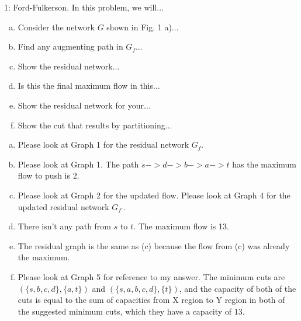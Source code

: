 \begin{problem}{1: Ford-Fulkerson.} In this problem, we will... 
\begin{enumerate}[(a)]
    \item Consider the network $G$ shown in Fig. 1 a)...
    \item Find any augmenting path in $G_f$...
    \item Show the residual network...
    \item Is this the final maximum flow in this...
    \item Show the residual network for your...
    \item Show the cut that results by partitioning...
\end{enumerate}
\end{problem}
\begin{sol}
\begin{enumerate}[(a)]
    \item Please look at Graph 1 for the residual network $G_f$.
    \item Please look at Graph 1. The path $s->d->b->a->t$ has the maximum flow to push is 2.
    \item Please look at Graph 2 for the updated flow. Please look at Graph 4 for the updated residual network $G_{f'}$.
    \item There isn't any path from $s$ to $t$. The maximum flow is 13.
    \item The residual graph is the same as (c) because the flow from (c) was already the maximum.
    \item Please look at Graph 5 for reference to my answer. The minimum cuts are $(\{s, b, c, d\},\{a, t\})$ and $(\{s, a, b, c, d\},\{t\})$, and the capacity of both of the cuts is equal to the sum of capacities from X region to Y region in both of the suggested minimum cuts, which they have a capacity of 13.
\end{enumerate}
\end{sol}